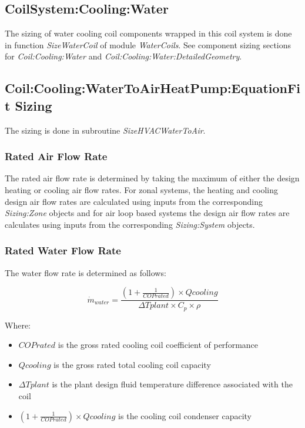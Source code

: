 \subsection{CoilSystem:Cooling:Water}\label{coilsystemcoolingwater}

The sizing of water cooling coil components wrapped in this coil system is done in function \textit{SizeWaterCoil} of module \textit{WaterCoils}. See component sizing sections for \textit{Coil:Cooling:Water} and \textit{Coil:Cooling:Water:DetailedGeometry}.

\subsection{Coil:Cooling:WaterToAirHeatPump:EquationFit Sizing}\label{coilcoolingwatertoairheatpumpequationfit-sizing}

The sizing is done in subroutine \emph{SizeHVACWaterToAir}.

\subsubsection{Rated Air Flow Rate}\label{rated-air-flow-rate}

The rated air flow rate is determined by taking the maximum of either the design heating or cooling air flow rates. For zonal systems, the heating and cooling design air flow rates are calculated using inputs from the corresponding \emph{Sizing:Zone} objects and for air loop based systems the design air flow rates are calculates using inputs from the corresponding \emph{Sizing:System} objects.

\subsubsection{Rated Water Flow Rate}\label{rated-water-flow-rate}

The water flow rate is determined as follows:

\begin{equation}
  \dot m_{water} = \frac{(1 + \frac{1}{COP{rated}}) \times Q{cooling}}{\Delta T{plant} \times C_p \times \rho}
\end{equation}

Where:

\begin{itemize}
  \item
    ${COP{rated}}$ is the gross rated cooling coil coefficient of performance
  \item
    $Q{cooling}$ is the gross rated total cooling coil capacity
  \item
    $\Delta T{plant}$ is the plant design fluid temperature difference associated with the coil
  \item
    $(1 + \frac{1}{COP{rated}}) \times Q{cooling}$ is the cooling coil condenser capacity
\end{itemize}

